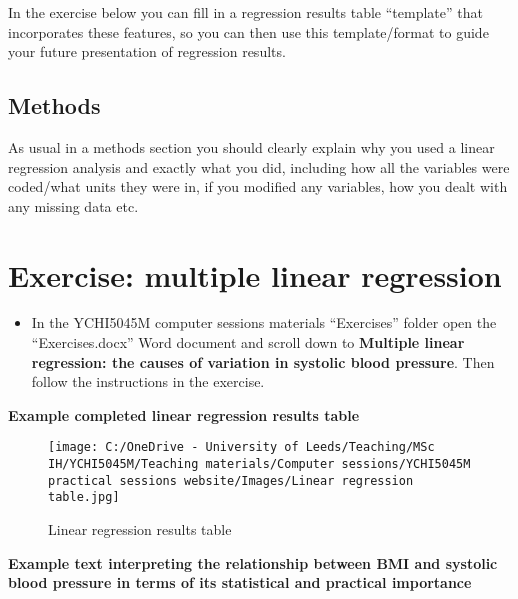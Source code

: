 \documentclass[
]{book}
\providecommand{\tightlist}{%
  \setlength{\itemsep}{0pt}\setlength{\parskip}{0pt}}
\begin{document}
In the exercise below you can fill in a regression results table ``template'' that incorporates these features, so you can then use this template/format to guide your future presentation of regression results.

\hypertarget{methods}{%
\subsection{Methods}\label{methods}}

As usual in a methods section you should clearly explain why you used a linear regression analysis and exactly what you did, including how all the variables were coded/what units they were in, if you modified any variables, how you dealt with any missing data etc.

\hypertarget{exercise-multiple-linear-regression}{%
\section{Exercise: multiple linear regression}\label{exercise-multiple-linear-regression}}

\begin{itemize}
\tightlist
\item
  In the YCHI5045M computer sessions materials ``Exercises'' folder open the ``Exercises.docx'' Word document and scroll down to \textbf{Multiple linear regression: the causes of variation in systolic blood pressure}. Then follow the instructions in the exercise.
\end{itemize}

\textbf{Example completed linear regression results table}

\begin{figure}
\centering
\texttt{[image: C:/OneDrive - University of Leeds/Teaching/MSc IH/YCHI5045M/Teaching materials/Computer sessions/YCHI5045M practical sessions website/Images/Linear regression table.jpg]}
\caption{Linear regression results table}
\end{figure}

\textbf{Example text interpreting the relationship between BMI and systolic blood pressure in terms of its statistical and practical importance}
\end{document}
